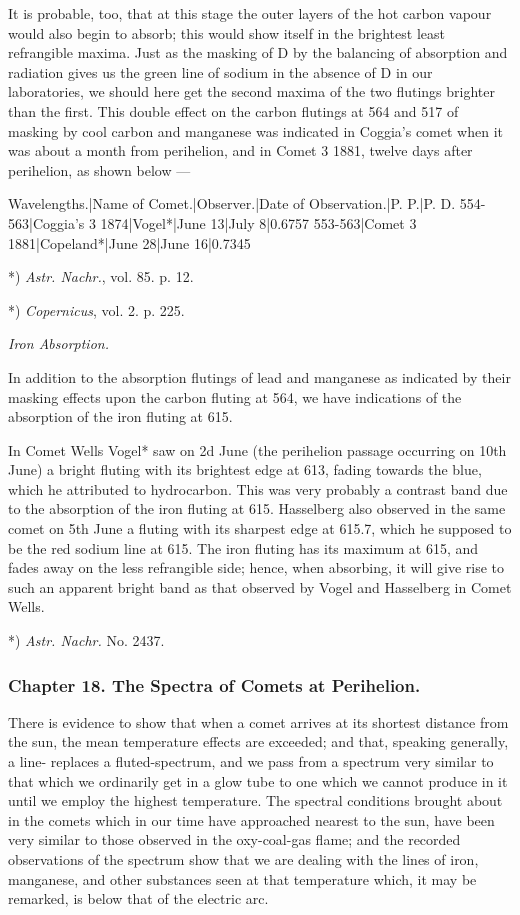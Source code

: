 \documentclass[a4paper, 12pt, oneside, polutonikogreek, english]{article}
\begin{document}
It is probable, too, that at this stage the outer layers of the hot carbon vapour would also begin to absorb; this would show itself in the brightest least refrangible maxima. Just as the masking of D by the balancing of absorption and radiation gives us the green line of sodium in the absence of D in our laboratories, we should here get the second maxima of the two flutings brighter than the first. This double effect on the carbon flutings at 564 and 517 of masking by cool carbon and manganese was indicated in Coggia's comet when it was about a month from perihelion, and in Comet 3 1881, twelve days after perihelion, as shown below ---

Wavelengths.|Name of Comet.|Observer.|Date of Observation.|P. P.|P. D. 
554-563|Coggia's 3 1874|Vogel*|June 13|July 8|0.6757 
553-563|Comet 3 1881|Copeland*|June 28|June 16|0.7345

*) \emph{Astr. Nachr.}, vol. 85. p. 12.

*) \emph{Copernicus}, vol. 2. p. 225.

\emph{Iron Absorption.}

In addition to the absorption flutings of lead and manganese as indicated by their masking effects upon the carbon fluting at 564, we have indications of the absorption of the iron fluting at 615.

In Comet Wells Vogel* saw on 2d June (the perihelion passage occurring on 10th June) a bright fluting with its brightest edge at 613, fading towards the blue, which he attributed to hydrocarbon. This was very probably a contrast band due to the absorption of the iron fluting at 615. Hasselberg also observed in the same comet on 5th June a fluting with its sharpest edge at 615.7, which he supposed to be the red sodium line at 615. The iron fluting has its maximum at 615, and fades away on the less refrangible side; hence, when absorbing, it will give rise to such an apparent bright band as that observed by Vogel and Hasselberg in Comet Wells.

*) \emph{Astr. Nachr.} No. 2437.

\subsubsection{Chapter 18. The Spectra of Comets at Perihelion.}

There is evidence to show that when a comet arrives at its shortest distance from the sun, the mean temperature effects are exceeded; and that, speaking generally, a line- replaces a fluted-spectrum, and we pass from a spectrum very similar to that which we ordinarily get in a glow tube to one which we cannot produce in it until we employ the highest temperature. The spectral conditions brought about in the comets which in our time have approached nearest to the sun, have been very similar to those observed in the oxy-coal-gas flame; and the recorded observations of the spectrum show that we are dealing with the lines of iron, manganese, and other substances seen at that temperature which, it may be remarked, is below that of the electric arc.
\end{document}

